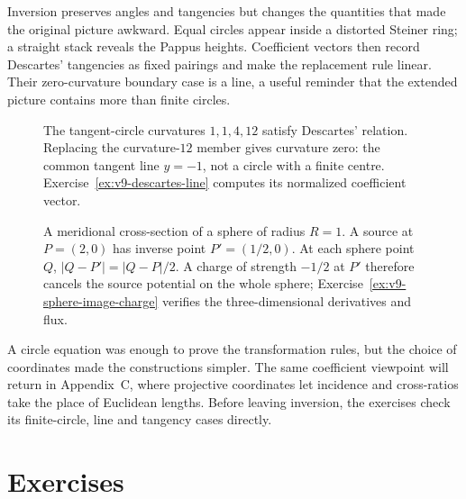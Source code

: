 \begin{beauty}
Inversion preserves angles and tangencies but changes the quantities that made the original picture awkward. Equal circles appear inside a distorted Steiner ring; a straight stack reveals the Pappus heights. Coefficient vectors then record Descartes' tangencies as fixed pairings and make the replacement rule linear. Their zero-curvature boundary case is a line, a useful reminder that the extended picture contains more than finite circles.
\end{beauty}

\begin{figure}[ht]
\centering
{}
\caption{The tangent-circle curvatures $1,1,4,12$ satisfy Descartes' relation. Replacing the curvature-$12$ member gives curvature zero: the common tangent line $y=-1$, not a circle with a finite centre. Exercise~\ref{ex:v9-descartes-line} computes its normalized coefficient vector.}
\label{fig:v9-descartes-line}
\end{figure}

\begin{figure}[ht]
\centering
{}
\caption{A meridional cross-section of a sphere of radius $R=1$. A source at $P=(2,0)$ has inverse point $P'=(1/2,0)$. At each sphere point $Q$, $|Q-P'|=|Q-P|/2$. A charge of strength $-1/2$ at $P'$ therefore cancels the source potential on the whole sphere; Exercise~\ref{ex:v9-sphere-image-charge} verifies the three-dimensional derivatives and flux.}
\label{fig:v9-sphere-image-charge}
\end{figure}
\FloatBarrier

A circle equation was enough to prove the transformation rules, but the choice of coordinates made the constructions simpler. The same coefficient viewpoint will return in Appendix~C, where projective coordinates let incidence and cross-ratios take the place of Euclidean lengths. Before leaving inversion, the exercises check its finite-circle, line and tangency cases directly.

\section{Exercises}

